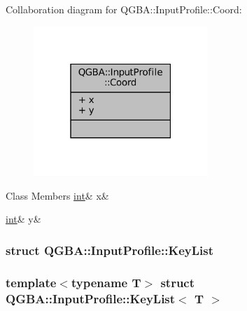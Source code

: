 Collaboration diagram for Q\+G\+BA\+:\+:Input\+Profile\+:\+:Coord\+:
\nopagebreak
\begin{figure}[H]
\begin{center}
\leavevmode
\includegraphics[width=187pt]{struct_q_g_b_a_1_1_input_profile_1_1_coord__coll__graph}
\end{center}
\end{figure}
\begin{DoxyFields}{Class Members}
\mbox{\label{class_q_g_b_a_1_1_input_profile_a1ea13ddf6b6064803185872288f0ae0f}} 
\mbox{\hyperlink{ioapi_8h_a787fa3cf048117ba7123753c1e74fcd6}{int}}&
x&
\\
\hline

\mbox{\label{class_q_g_b_a_1_1_input_profile_a567aba1f34d9efabc509a6955879b074}} 
\mbox{\hyperlink{ioapi_8h_a787fa3cf048117ba7123753c1e74fcd6}{int}}&
y&
\\
\hline

\end{DoxyFields}
\label{struct_q_g_b_a_1_1_input_profile_1_1_key_list}
\subsubsection{struct Q\+G\+BA\+:\+:Input\+Profile\+:\+:Key\+List}
\subsubsection*{template$<$typename T$>$\newline
struct Q\+G\+B\+A\+::\+Input\+Profile\+::\+Key\+List$<$ T $>$}



